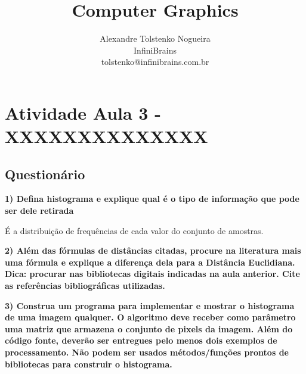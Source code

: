 \documentclass[a4paper]{sbgames}               %
\title{Computer Graphics}
\author{Alexandre Tolstenko Nogueira\\InfiniBrains\\tolstenko@infinibrains.com.br 
}
\begin{document}


\maketitle




\section{Atividade Aula 3 - XXXXXXXXXXXXXX}

\subsection*{Questionário}

\textbf{1) Defina histograma e explique qual é o tipo de informação que pode ser dele retirada}

É a distribuição de frequências de cada valor do conjunto de amostras.

\textbf{2) Além das fórmulas de distâncias citadas, procure na literatura mais uma fórmula e explique a diferença dela para a Distância Euclidiana. Dica: procurar nas bibliotecas digitais indicadas na aula anterior. Cite as referências bibliográficas
utilizadas.
}

\textbf{3) Construa um programa para implementar e mostrar o histograma de uma imagem qualquer. O algoritmo deve receber como parâmetro uma matriz que armazena o conjunto de pixels da imagem. Além do código fonte, deverão ser entregues pelo menos dois exemplos de processamento. Não podem ser usados métodos/funções prontos de bibliotecas para construir o histograma.}
\end{document}
